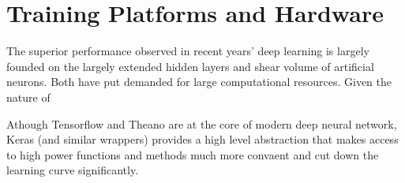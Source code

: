 \section{Training Platforms and Hardware}
The superior performance observed in recent years' deep learning is largely founded on the largely extended hidden layers and shear volume of artificial neurons. Both have put demanded for large computational resources. Given the nature of

Athough Tensorflow and Theano are at the core of modern deep neural network, Keras (and similar wrappers) provides a high level abstraction that makes access to high power functions and methods much more convaent and cut down the learning curve significantly.  